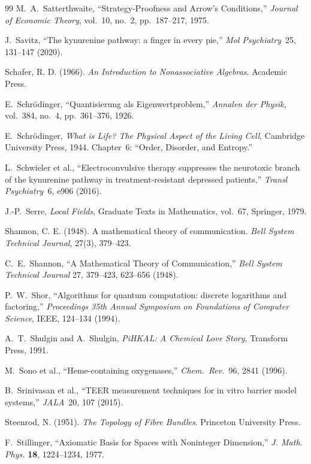 \begin{thebibliography}{99}
M.~A.~Satterthwaite,
``Strategy-Proofness and Arrow's Conditions,''
\emph{Journal of Economic Theory}, vol.~10, no.~2, pp.~187--217, 1975.

 J.~Savitz, ``The kynurenine pathway: a finger in every pie,'' \emph{Mol Psychiatry}\ 25, 131--147 (2020).

 Schafer, R. D. (1966). \emph{An Introduction to Nonassociative Algebras}. Academic Press.

E.~Schr\"odinger, ``Quantisierung als Eigenwertproblem,'' \emph{Annalen der Physik}, vol.~384, no.~4, pp.~361--376, 1926.

E.~Schr\"odinger,
\emph{What is Life? The Physical Aspect of the Living Cell},
Cambridge University Press, 1944.
Chapter~6: ``Order, Disorder, and Entropy.''

 L.~Schwieler et al., ``Electroconvulsive therapy suppresses the neurotoxic branch of the kynurenine pathway in treatment-resistant depressed patients,'' \emph{Transl Psychiatry}\ 6, e906 (2016).

J.-P.~Serre,
\emph{Local Fields},
Graduate Texts in Mathematics, vol.~67, Springer, 1979.

 Shannon, C. E. (1948). A mathematical theory of communication. \emph{Bell System Technical Journal}, 27(3), 379--423.

C.~E.~Shannon,
``A Mathematical Theory of Communication,''
\emph{Bell System Technical Journal} 27, 379--423, 623--656 (1948).

P.~W.~Shor,
``Algorithms for quantum computation: discrete logarithms and factoring,''
\emph{Proceedings 35th Annual Symposium on Foundations of Computer Science}, IEEE, 124--134 (1994).

A.~T.~Shulgin and A.~Shulgin,
\emph{PiHKAL: A Chemical Love Story},
Transform Press, 1991.

 M.~Sono et al., ``Heme-containing oxygenases,'' \emph{Chem.\ Rev.}\ 96, 2841 (1996).

 B.~Srinivasan et al., ``TEER measurement techniques for in vitro barrier model systems,'' \emph{JALA}\ 20, 107 (2015).

 Steenrod, N. (1951). \emph{The Topology of Fibre Bundles}. Princeton University Press.

F.~Stillinger, ``Axiomatic Basis for Spaces with Noninteger Dimension,'' \emph{J. Math. Phys.} \textbf{18}, 1224--1234, 1977.


\end{thebibliography}
